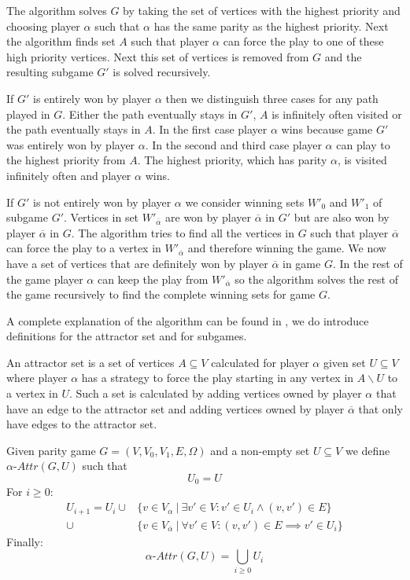 The algorithm solves $G$ by taking the set of vertices with the highest priority and choosing player $\alpha$ such that $\alpha$ has the same parity as the highest priority. Next the algorithm finds set $A$ such that player $\alpha$ can force the play to one of these high priority vertices. Next this set of vertices is removed from $G$ and the resulting subgame $G'$ is solved recursively. 

If $G'$ is entirely won by player $\alpha$ then we distinguish three cases for any path played in $G$. Either the path eventually stays in $G'$, $A$ is infinitely often visited or the path eventually stays in $A$. In the first case player $\alpha$ wins because game $G'$ was entirely won by player $\alpha$. In the second and third case player $\alpha$ can play to the highest priority from $A$. The highest priority, which has parity $\alpha$, is visited infinitely often and player $\alpha$ wins.

If $G'$ is not entirely won by player $\alpha$ we consider winning sets $W'_0$ and $W'_1$ of subgame $G'$. Vertices in set $W'_{\overline{\alpha}}$ are won by player $\overline{\alpha}$ in $G'$ but are also won by player $\overline{\alpha}$ in $G$. The algorithm tries to find all the vertices in $G$ such that player $\overline{\alpha}$ can force the play to a vertex in $W'_{\overline{\alpha}}$ and therefore winning the game. We now have a set of vertices that are definitely won by player $\overline{\alpha}$ in game $G$. In the rest of the game player $\alpha$ can keep the play from $W'_{\overline{\alpha}}$ so the algorithm solves the rest of the game recursively to find the complete winning sets for game $G$.

A complete explanation of the algorithm can be found in \cite{ZIELONKA1998135}, we do introduce definitions for the attractor set and for subgames. 

An attractor set is a set of vertices $A \subseteq V$ calculated for player $\alpha$ given set $U \subseteq V$ where player $\alpha$ has a strategy to force the play starting in any vertex in $A \backslash U$ to a vertex in $U$. Such a set is calculated by adding vertices owned by player $\alpha$ that have an edge to the attractor set and adding vertices owned by player $\overline{\alpha}$ that only have edges to the attractor set.

\begin{definition}
	\label{def_attr}Given parity game $G = (V,V_0,V_1,E,\Omega)$ and a non-empty set $U \subseteq V$ we define $\alpha\textit{-Attr}(G,U)$ such that
	\[U_0 = U \]
	For $i \geq 0$:
	\begin{align*}
	U_{i+1} = U_i\cup
	&\{v \in V_\alpha\ |\ \exists v' \in V : v' \in U_i \wedge (v,v') \in E \}\\
	\cup &\{v \in V_{\overline{\alpha}}\ |\ \forall v' \in V :(v,v') \in E \implies v' \in U_i \}
	\end{align*}
	Finally:
	\[\alpha\textit{-Attr}(G,U) = \bigcup_{i \geq 0} U_i \]
\end{definition}

